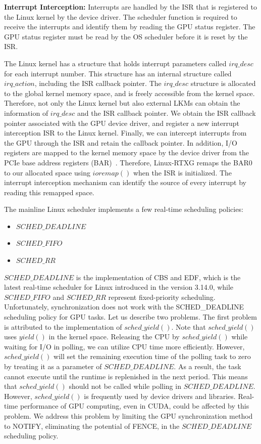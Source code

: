 \textbf{Interrupt Interception:}
Interrupts are handled by the ISR that is registered to the Linux kernel
by the device driver.
The scheduler function is required to receive the interrupts and
identify them by reading the GPU status register.
The GPU status register must be read by the OS scheduler before it is
reset by the ISR.

The Linux kernel has a structure that holds interrupt parameters called
$irq\_desc$ for each interrupt number.
This structure has an internal structure called $irq\_action$,
including the ISR callback pointer.
The $irq\_desc$ structure is allocated to the global kernel memory
space, and is freely accessible from the kernel space.
Therefore, not only the Linux kernel but also external LKMs can obtain
the information of $irq\_desc$ and the ISR callback pointer.
We obtain the ISR callback pointer associated with the GPU device
driver, and register a new interrupt interception ISR to the Linux
kernel.
Finally, we can intercept interrupts from the GPU through the ISR and
retain the callback pointer.
In addition, I/O registers are mapped to the kernel memory space by the
device driver from the PCIe base address registers
(BAR)~\cite{fujii:icpads2013,kato2013zero}.
Therefore, Linux-RTXG remaps the BAR0 to our allocated space using
$ioremap()$ when the ISR is initialized. 
The interrupt interception mechanism can identify the source of every
interrupt by reading this remapped space.

The mainline Linux scheduler implements a few real-time scheduling
policies:
\begin{itemize}
 \item $SCHED\_DEADLINE$
 \item $SCHED\_FIFO$
 \item $SCHED\_RR$
\end{itemize}

$SCHED\_DEADLINE$ is the implementation of CBS and EDF, which is the
latest real-time scheduler for Linux introduced in the version 3.14.0,
while $SCHED\_FIFO$ and $SCHED\_RR$ represent fixed-priority
scheduling.
Unfortunately, synchronization does not work with the SCHED\_DEADLINE
scheduling policy for GPU tasks.
Let us describe two problems.
The first problem is attributed to the implementation of
$sched\_yield()$.
Note that $sched\_yield()$ uses $yield()$ in the kernel space.
Releasing the CPU by $sched\_yield()$ while waiting for I/O in polling,
we can utilize CPU time more efficiently.
However, $sched\_yield()$ will set the remaining execution time of the
polling task to zero by treating it as a parameter of $SCHED\_DEADLINE$.
As a result, the task cannot execute until the runtime is replenished in
the next period.
This means that $sched\_yield()$ should not be called while polling in
$SCHED\_DEADLINE$.
However, $sched\_yield()$ is frequently used by device drivers and
libraries.
Real-time performance of GPU computing, even in CUDA, could be affected
by this problem.
We address this problem by limiting the GPU synchronization method to
NOTIFY, eliminating the potential of FENCE, in the $SCHED\_DEADLINE$
scheduling policy.

